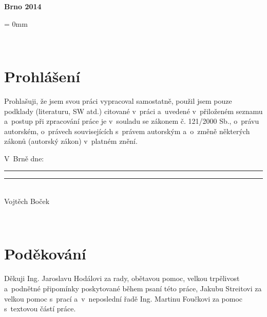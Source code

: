 \documentclass[12pt, a4paper, oneside]{article}
\newcommand{\B}{\textbf} %
\begin{document}
\vspace{20mm}

\begin{center}
\B{Brno 2014}

\end{center}
\normalsize
\newpage  %
\voffset = 0mm %

~ %

\vspace{10mm}

\section*{Prohlášení}

Prohlašuji, že jsem svou práci vypracoval samostatně, použil jsem pouze podklady (literaturu, SW atd.) citované v~práci a~uvedené v~přiloženém seznamu a~postup při zpracování práce je v~souladu se zákonem č. 121/2000 Sb., o~právu autorském, o~právech souvisejících s~právem autorským a~o~změně některých zákonů (autorský zákon) v~platném znění.

\vspace{10mm}

\noindent \parbox{\textwidth}{
\noindent V~Brně dne: \rule{4cm}{1pt}
\hfill\parbox{5cm}{
    \centering
    \vspace{9mm}
    \rule{5cm}{1pt}\\
        Vojtěch Boček
}
}
 

\newpage   %

~ %
\vspace{150mm}

\section*{Poděkování}
Děkuji Ing. Jaroslavu Hodálovi za rady, obětavou pomoc, velkou trpělivost a~podnětné připomínky poskytované během psaní této práce, Jakubu \mbox{Streitovi} za velkou pomoc s~prací a~v~neposlední řadě Ing. Martinu Foučkovi za pomoc s~textovou částí práce.
 

\newpage   %
~ %
\vspace{-20mm}
\end{document}
